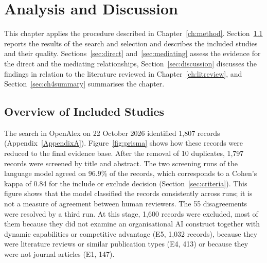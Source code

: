%

\chapter{Analysis and Discussion}
\label{ch:analysis}

This chapter applies the procedure described in Chapter~\ref{ch:method}. Section~\ref{sec:overview} reports the results of the search and selection and describes the included studies and their quality. Sections~\ref{sec:direct} and~\ref{sec:mediating} assess the evidence for the direct and the mediating relationships, Section~\ref{sec:discussion} discusses the findings in relation to the literature reviewed in Chapter~\ref{ch:litreview}, and Section~\ref{sec:ch4summary} summarises the chapter.

\section{Overview of Included Studies}
\label{sec:overview}

The search in OpenAlex on 22 October 2026 identified 1,807 records (Appendix~\ref{AppendixA}). Figure~\ref{fig:prisma} shows how these records were reduced to the final evidence base. After the removal of 10 duplicates, 1,797 records were screened by title and abstract. The two screening runs of the language model agreed on 96.9\% of the records, which corresponds to a Cohen's kappa of 0.84 for the include or exclude decision (Section~\ref{sec:criteria}). This figure shows that the model classified the records consistently across runs; it is not a measure of agreement between human reviewers. The 55 disagreements were resolved by a third run. At this stage, 1,600 records were excluded, most of them because they did not examine an organisational AI construct together with dynamic capabilities or competitive advantage (E5, 1,032 records), because they were literature reviews or similar publication types (E4, 413) or because they were not journal articles (E1, 147).

